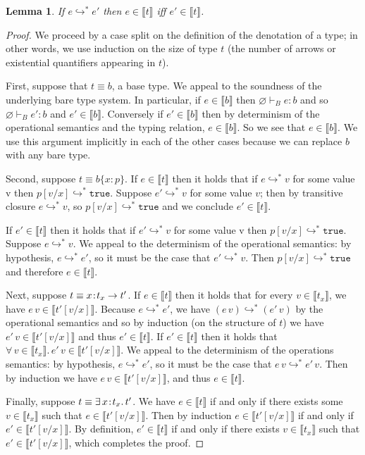 \documentclass[11pt]{article}
\newtheorem{lemma}[theorem]{Lemma}
\newcommand{\bind}{\hspace{0.1em}{:}\hspace{0.1em}} %
\newcommand{\col}{\mathbin{:}}       %
\newcommand{\lb}{\llbracket}         %
\newcommand{\rb}{\rrbracket}         %
\newcommand{\many}{\hookrightarrow^*}
\newcommand{\true}{\mathtt{true}}
\begin{document}
\begin{lemma}{
If $e \hookrightarrow^* e'$ then $e \in \lb t\rb$ iff $e' \in \lb t\rb$.}
\end{lemma}
\begin{proof}
We proceed by a case split on the definition of the denotation of a type; in other words, we use induction on the size of type $t$ (the number of arrows or existential quantifiers appearing in $t$).

First, suppose that $t \equiv b$, a base type. We appeal to the soundness of the underlying bare type system. In particular, if
$e \in \lb b \rb$ then $\varnothing \vdash_B e : b$ and so $\varnothing \vdash_B e' : b$ and $e' \in \lb b \rb$.
Conversely if $e' \in \lb b \rb$ then by determinism of the operational semantics and the typing relation, $e \in \lb b \rb$. So we see that $e \in \lb b\rb$. We use this argument implicitly in each of the other cases because we can replace $b$ with any bare type.

Second, suppose $t \equiv b\{x\col p\}$.
If $e \in \lb t\rb$ then it holds that 
if $e \many v$ for some value v then $p[v/x] \many \true$.
Suppose $e' \many v$ for some value $v$; then by transitive closure $e \many v$, so $p[v/x] \many \true$ and we conclude $e' \in \lb t \rb$.

If $e' \in \lb t\rb$ then it holds that %
if $e' \many v$ for some value v then $p[v/x] \many \true$. Suppose $e \many v$. We appeal to the determinism of the operational semantics: by hypothesis, $e \many e'$, so it must be the case that $e' \many v$. Then $p[v/x] \many \true$ and %
therefore $e \in \lb t \rb$.

Next, suppose $t \equiv x\bind t_x \rightarrow t'$.
If $e \in \lb t\rb$ then it holds that %
for every $v \in \lb t_x \rb$, we have $e\, v \in \lb t'[v/x]\rb$.
Because $e \many e'$, we have $(e\, v) \many (e'\, v)$ by the operational semantics and so by induction (on the structure of  $t$) we have $e'\, v \in \lb t'[v/x]\rb$ and thus $e' \in \lb t\rb$.
If $e' \in \lb t\rb$ then it holds that %
$\forall\, v \in \lb t_x \rb.\, e'\, v \in \lb t'[v/x]\rb$.
We appeal to the determinism of the operations semantics: by hypothesis, $e \many e'$, so it must be the case that $e\, v \many e'\, v$. Then by induction we have $e\, v \in \lb t'[v/x]\rb$, and thus $e\in\lb t\rb$.

Finally, suppose $t \equiv \exists\, x\bind t_x.\, t'$. We have $e \in \lb t \rb$ if and only if there exists some $v \in \lb t_x \rb$ such that 
$e \in \lb t'[v/x]\rb$. Then by induction $e \in \lb t'[v/x]\rb$ if and only if $e' \in \lb t'[v/x]\rb$. By definition, $e' \in \lb t\rb$ if and only if there exists $v \in \lb t_x\rb$ such that $e'\in\lb t'[v/x]\rb$, which completes the proof.
\end{proof}
\end{document}
